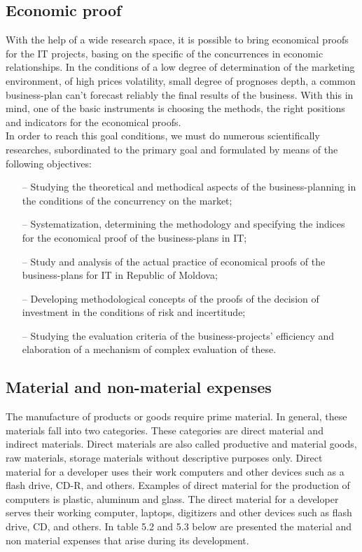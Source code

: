 \subsection{Economic proof}
With the help of a wide research space, it is possible to bring economical
proofs for the IT projects, basing on the specific of the concurrences in
economic relationships. In the conditions of a low degree of determination of
the marketing environment, of high prices volatility, small degree of prognoses
depth, a common business-plan can't forecast reliably the final results of the
business. With this in mind, one of the basic instruments is choosing the
methods, the right positions and indicators for the economical proofs. \\
In order to reach this goal conditions, we must do numerous scientifically
researches, subordinated to the primary goal and formulated by means of the
following objectives:
\begin{enumerate}
    \item[--] Studying the theoretical and methodical aspects of the business-planning in the conditions of the concurrency on the market;
    \item[--] Systematization, determining the methodology and specifying the indices for the economical proof of the business-plans in IT;
    \item[--] Study and analysis of the actual practice of economical proofs of the business-plans for IT in Republic of Moldova;
    \item[--] Developing methodological concepts of the proofs of the decision of investment in the conditions of risk and incertitude;
    \item[--]  Studying the evaluation criteria of the business-projects’ efficiency and elaboration of a mechanism of complex evaluation of these.
\end{enumerate}

\subsection{Material and non-material expenses}
The manufacture of products or goods require prime material. In general, these
materials fall into two categories. These categories are direct material and
indirect materials. Direct materials are also called productive and material
goods, raw materials, storage materials without descriptive purposes only.
Direct material for a developer uses their work computers and other devices such
as a flash drive, CD-R, and others. Examples of direct material for the
production of computers is plastic, aluminum and glass. The direct material for
a developer serves their working computer, laptops, digitizers and other devices
such as flash drive, CD, and others. In table 5.2 and 5.3 below are presented
the material and non material expenses that arise during its development.

